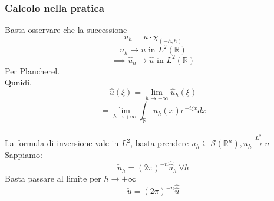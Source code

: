 \documentclass[a4paper]{article}
\newcommand{\R}{\mathbb{R}}
\begin{document}
\subsubsection{Calcolo nella pratica}
Basta osservare che la successione
\[u_h=u\cdot \chi_{(-h,h)}\]
\[u_h\xrightarrow {}u\text{ in }L^{2}(\R)\]
\[\implies \hat{u}_h\to \hat{u}\text{ in }L^{2}(\R)\]
Per Plancherel.\\
Qunidi,
\[\hat{u}(\xi)=\lim_{h \to +\infty} \hat{u}_h(\xi)\]
\[=\lim_{h \to +\infty} \int_{\R}^{} u_h(x)e^{-i\xi x}dx\]
\\La formula di inversione vale in $L^{2}$, basta prendere $u_h \subseteq  \mathcal S(\R^n),u_h\xrightarrow{L^2}u$ \\
Sappiamo:
\[\check u_h=(2\pi)^{-n}\hat{\hat{u}}_h\ \forall h\]
Basta passare al limite per $h\to +\infty$ 
\[\check u=(2\pi)^{-n}\hat{\hat{u}}\]
\end{document}
